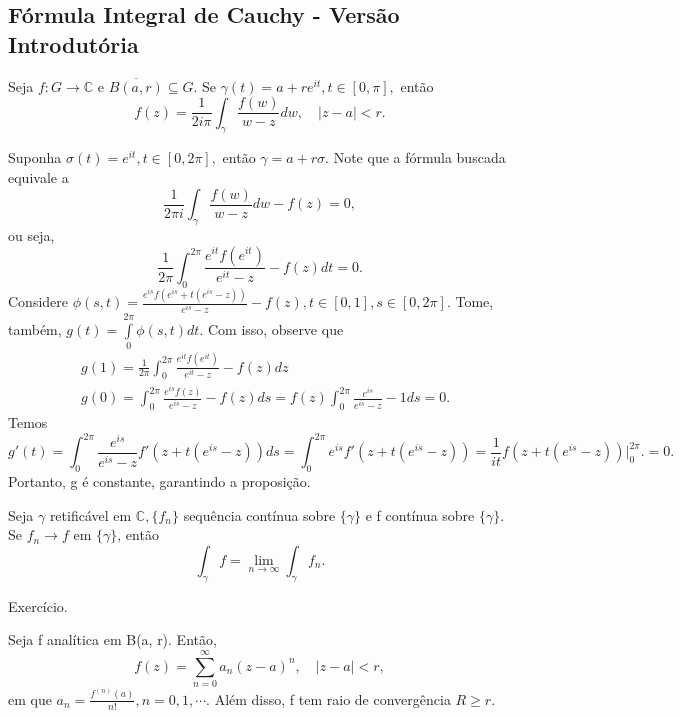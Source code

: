 \documentclass[ComplexAnalysis/complex.tex]{subfiles}
\begin{document}
\subsection{Fórmula Integral de Cauchy - Versão Introdutória}
\begin{prop*}
	Seja $f:G\rightarrow \mathbb{C}$ e $\overline{B(a, r)}\subseteq{G}.$ Se $\gamma(t) = a + r e^{it}, t\in[0, \pi],$ então
	$$
		f(z) = \frac{1}{2i\pi}\int_{\gamma}^{}\frac{f(w)}{w-z}dw, \quad |z-a| < r.
	$$
\end{prop*}
\begin{proof*}
	Suponha $\sigma(t) = e^{it}, t\in[0, 2\pi],$ então $\gamma = a + r\sigma.$ Note que a fórmula buscada equivale a
	$$
		\frac{1}{2\pi i}\int_{\gamma}^{}\frac{f(w)}{w-z}dw - f(z) = 0,
	$$
	ou seja,
	$$
		\frac{1}{2\pi}\int_{0}^{2\pi}\frac{e^{it}f(e^{it})}{e^{it}-z} - f(z) dt = 0.
	$$
	Considere $\phi(s, t) = \frac{e^{is}f(e^{is}+t(e^{is}-z))}{e^{is}-z} - f(z), t\in[0, 1], s\in[0, 2\pi]$. Tome, também,
	$g(t) = \int\limits_{0}^{2\pi}\phi(s, t)dt$. Com isso, observe que
	\begin{align*}
		 & g(1) = \frac{1}{2\pi}\int_{0}^{2\pi}\frac{e^{it}f(e^{it})}{e^{it}-z} - f(z)dz                                       \\
		 & g(0) = \int_{0}^{2\pi}\frac{e^{is}f(z)}{e^{is}-z} - f(z) ds = f(z)\int_{0}^{2\pi}\frac{e^{is}}{e^{is}-z} - 1ds = 0.
	\end{align*}
	Temos
	$$
		g'(t) = \int_{0}^{2\pi}\frac{e^{is}}{e^{is}-z}f'(z + t(e^{is}-z))ds = \int_{0}^{2\pi}e^{is}f'(z + t(e^{is}-z)) =
		\frac{1}{it}f(z + t(e^{is}-z)) \biggl|_{0}^{2\pi}\biggr. = 0.
	$$
	Portanto, g é constante, garantindo a proposição. \qedsymbol
\end{proof*}
\begin{lmm*}
	Seja $\gamma$ retificável em $\mathbb{C},\{f_{n}\} $ sequência contínua sobre $\{\gamma\} $ e f contínua sobre
	$\{\gamma\}$. Se $f_{n}\to{f}$ em $\{\gamma\}$, então
	$$
		\int_{\gamma}^{}f = \lim_{n\to\infty}\int_{\gamma}^{}f_{n}.
	$$
\end{lmm*}
\begin{proof*}
	Exercício.
\end{proof*}
\begin{theorem*}
	Seja f analítica em B(a, r). Então,
	$$
		f(z) = \sum\limits_{n=0}^{\infty}a_{n}(z-a)^{n}, \quad |z-a| < r,
	$$
	em que $a_{n} = \frac{f^{(n)}(a)}{n!}, n = 0, 1, \cdots.$ Além disso, f tem raio de convergência $R\geq{r}.$
\end{theorem*}
\end{document}
